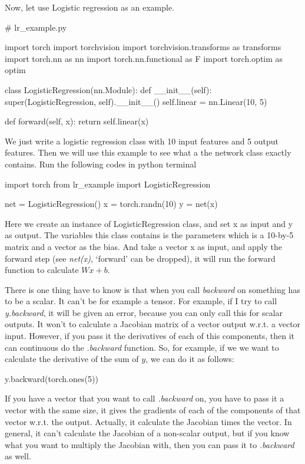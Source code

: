 Now, let use Logistic regression as an example.
\begin{python}
# lr_example.py

import torch 
import torchvision
import torchvision.transforms as transforms
import torch.nn as nn
import torch.nn.functional as F
import torch.optim as optim


class LogisticRegression(nn.Module):
    def __init__(self):
        super(LogisticRegression, self).__init__()
        self.linear = nn.Linear(10, 5)

    def forward(self, x):
        return self.linear(x)
\end{python}
We just write a logistic regression class with 10 input features and 5 output features. Then we will use this example to see what a the network class exactly contains.
Run the following codes in python terminal
\begin{python}
import torch
from lr_example import LogisticRegression

net = LogisticRegression()
x = torch.randn(10)
y = net(x)
\end{python}
Here we create an instance of LogisticRegression class, and set x as input and y as output. The variables this class contains is the parameters which is a 10-by-5 matrix and a vector as the bias. And take a vector x as input, and apply the forward step (see \emph{net(x)}, `forward' can be dropped), it will run the forward function to calculate $W x+b$.

There is one thing have to know is that when you call \emph{backward} on something has to be a scalar. It can't be for example a tensor. For example, if I try to call \emph{y.backward}, it will be given an error, because you can only call this for scalar outputs. It won't to calculate a Jacobian matrix of a vector output w.r.t. a vector input. However, if you pass it the derivatives of each of this components, then it can continuous do the \emph{.backward} function. So, for example, if we we want to calculate the derivative of the sum of $y$, we can do it as follows:
\begin{python}
y.backward(torch.ones(5))
\end{python}
If you have a vector that you want to call \emph{.backward} on, you have to pass it a vector with the same size, it gives the gradients of each of the components of that vector w.r.t. the output. Actually, it calculate the Jacobian times the vector. In general, it can't calculate the Jacobian of a non-scalar output, but if you know what you want to multiply the Jacobian with, then you can pass it to \emph{.backward} as well. 

